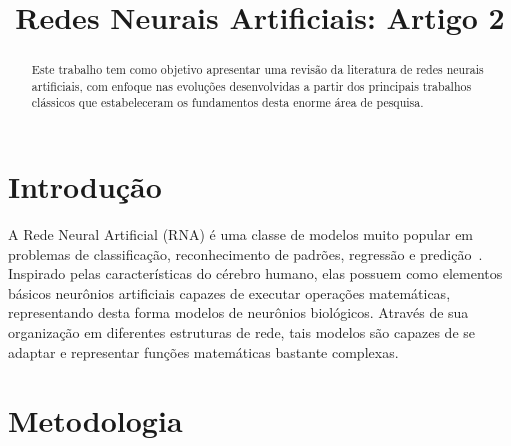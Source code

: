 \documentclass[conference]{IEEEtran}
\begin{document}
	
	\title{Redes Neurais Artificiais: Artigo 2}
	
	
	\author{
		}
	
	
	
	\maketitle
	
	\begin{abstract}
		Este trabalho tem como objetivo apresentar uma revisão da literatura de redes neurais artificiais, com enfoque nas evoluções desenvolvidas a partir dos principais trabalhos clássicos que estabeleceram os fundamentos desta enorme área de pesquisa. 
	\end{abstract}

	\section{Introdução}
	A Rede Neural Artificial (RNA) é uma classe de modelos muito popular em problemas de classificação, reconhecimento de padrões, regressão e predição~\cite{jain1996artificial}. Inspirado pelas características do cérebro humano, elas possuem como elementos básicos neurônios artificiais capazes de executar operações matemáticas, representando desta forma modelos de neurônios biológicos. Através de sua organização em diferentes estruturas de rede, tais modelos são capazes de se adaptar e representar funções matemáticas bastante complexas. 

	
	\section{Metodologia}
	
\end{document}
